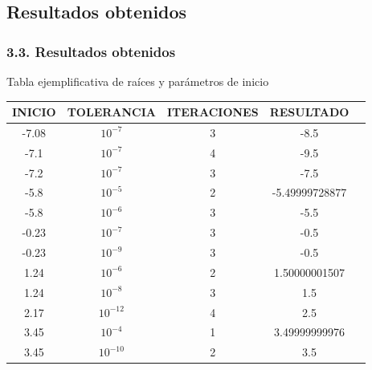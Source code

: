 \documentclass{beamer}
\begin{document}
\subsection{Resultados obtenidos}
\begin{frame}
\frametitle{3.3. Resultados obtenidos}
\begin{block}{Tabla ejemplificativa de raíces y parámetros de inicio}

\vspace*{-0.6cm}
\begin{table}
\end{table}
\begin{table}[H]
\begin{center}
\begin{tabular}{|c|c|c|c|c|}

   \hline
   \textbf{INICIO}  & \textbf{TOLERANCIA}  & \textbf{ITERACIONES } & \textbf{RESULTADO}  \\ \hline
   -7.08            & $10^{-7}$            & 3                     & -8.5                \\ \hline
   -7.1             & $10^{-7}$            & 4                     & -9.5                \\ \hline
   -7.2             & $10^{-7}$            & 3                     & -7.5                \\ \hline
   -5.8             & $10^{-5}$            & 2                     & -5.49999728877      \\ \hline
   -5.8             & $10^{-6}$            & 3                     & -5.5                \\ \hline
   -0.23            & $10^{-7}$            & 3                     & -0.5                \\ \hline
   -0.23            & $10^{-9}$            & 3                     & -0.5                \\ \hline
   1.24             & $10^{-6}$            & 2                     & 1.50000001507       \\ \hline
   1.24             & $10^{-8}$            & 3                     & 1.5                 \\ \hline
   2.17             & $10^{-12}$           & 4                     & 2.5                 \\ \hline
   3.45             & $10^{-4}$            & 1                     & 3.49999999976       \\ \hline
   3.45             & $10^{-10}$           & 2                     & 3.5                 \\ \hline

\end{tabular}
\end{center}
\label{nwtable}
\end{table}

\end{block}
\end{frame}
\end{document}
